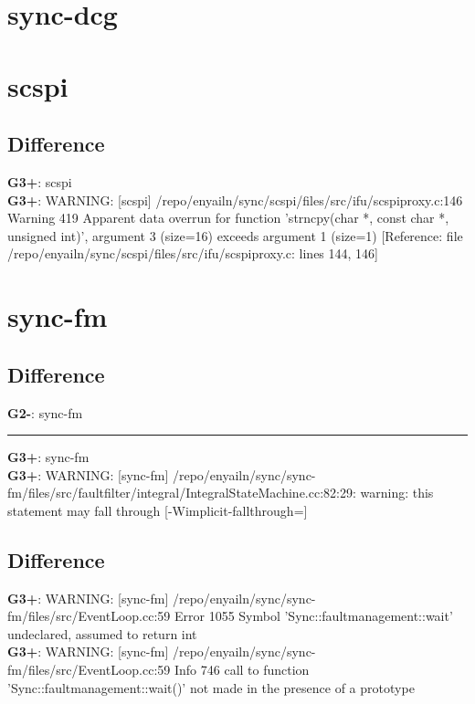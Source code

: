 \documentclass[12pt,twoside]{article}
\begin{document}
\section{sync-dcg} 
  
\section{scspi} 
\subsection{Difference} 
  
\textbf{G3+}: scspi\\ 
\textbf{G3+}: WARNING: [scspi] /repo/enyailn/sync/scspi/files/src/ifu/scspiproxy.c:146 Warning 419 Apparent data overrun for function 'strncpy(char *, const char *, unsigned int)', argument 3 (size=16) exceeds argument 1 (size=1) [Reference: file /repo/enyailn/sync/scspi/files/src/ifu/scspiproxy.c: lines 144, 146]\\ 
  
\section{sync-fm} 
\subsection{Difference} 
\textbf{G2-}: sync-fm 
\rule{\textwidth}{0.5pt} 
\textbf{G3+}: sync-fm\\ 
\textbf{G3+}: WARNING: [sync-fm] /repo/enyailn/sync/sync-fm/files/src/faultfilter/integral/IntegralStateMachine.cc:82:29: warning: this statement may fall through [-Wimplicit-fallthrough=]\\ 
\subsection{Difference} 
\textbf{G3+}: WARNING: [sync-fm] /repo/enyailn/sync/sync-fm/files/src/EventLoop.cc:59 Error 1055 Symbol 'Sync::faultmanagement::wait' undeclared, assumed to return int\\ 
\textbf{G3+}: WARNING: [sync-fm] /repo/enyailn/sync/sync-fm/files/src/EventLoop.cc:59 Info 746 call to function 'Sync::faultmanagement::wait()' not made in the presence of a prototype\\ 
\end{document}
